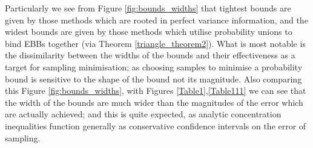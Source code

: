 Particularly we see from Figure \ref{fig:bounds_widths} that tightest bounds are given by those methods which are rooted in perfect variance information, and the widest bounds are given by those methods which utilise probability unions to bind EBBs together (via Theorem \ref{triangle_theorem2}).
What is most notable is the dissimilarity between the widths of the bounds and their effectiveness as a target for sampling minimisation; as choosing samples to minimise a probability bound is sensitive to the shape of the bound not its magnitude.
Also comparing this Figure \ref{fig:bounds_widths}, with Figures \ref{Table1},\ref{Table111} we can see that the width of the bounds are much wider than the magnitudes of the error which are actually achieved; and this is quite expected, as analytic concentration inequalities function generally as conservative confidence intervals on the error of sampling.

%




